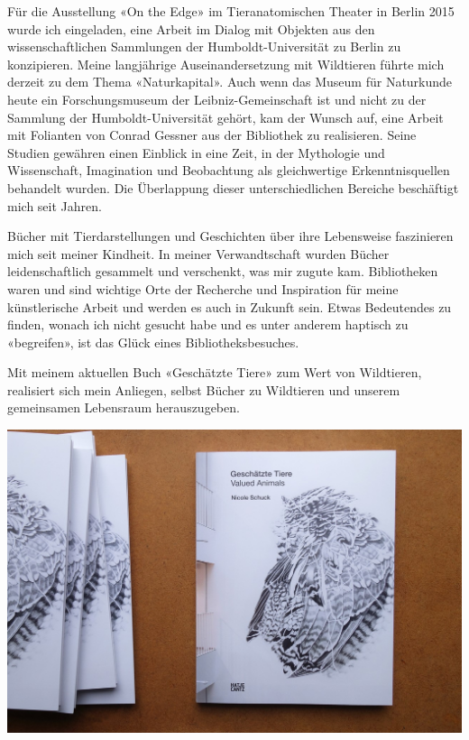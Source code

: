 \documentclass[a4paper,
fontsize=11pt,
oneside,
numbers=noperiodatend,
parskip=half-,
bibliography=totoc,
final
]{scrartcl}
\begin{document}
Für die Ausstellung «On the Edge» im Tieranatomischen Theater in Berlin
2015 wurde ich eingeladen, eine Arbeit im Dialog mit Objekten aus den
wissenschaftlichen Sammlungen der Humboldt-Universität zu Berlin zu
konzipieren. Meine langjährige Auseinandersetzung mit Wildtieren führte
mich derzeit zu dem Thema «Naturkapital». Auch wenn das Museum für
Naturkunde heute ein Forschungsmuseum der Leibniz-Gemeinschaft ist und
nicht zu der Sammlung der Humboldt-Universität gehört, kam der Wunsch
auf, eine Arbeit mit Folianten von Conrad Gessner aus der Bibliothek zu
realisieren. Seine Studien gewähren einen Einblick in eine Zeit, in der
Mythologie und Wissenschaft, Imagination und Beobachtung als
gleichwertige Erkenntnisquellen behandelt wurden. Die Überlappung dieser
unterschiedlichen Bereiche beschäftigt mich seit Jahren.

Bücher mit Tierdarstellungen und Geschichten über ihre Lebensweise
faszinieren mich seit meiner Kindheit. In meiner Verwandtschaft wurden
Bücher leidenschaftlich gesammelt und verschenkt, was mir zugute kam.
Bibliotheken waren und sind wichtige Orte der Recherche und Inspiration
für meine künstlerische Arbeit und werden es auch in Zukunft sein. Etwas
Bedeutendes zu finden, wonach ich nicht gesucht habe und es unter
anderem haptisch zu «begreifen», ist das Glück eines
Bibliotheksbesuches.

Mit meinem aktuellen Buch «Geschätzte Tiere» zum Wert von Wildtieren,
realisiert sich mein Anliegen, selbst Bücher zu Wildtieren und unserem
gemeinsamen Lebensraum herauszugeben.

\begin{center}
\includegraphics{img/image1.jpg}
\end{center}
\end{document}
